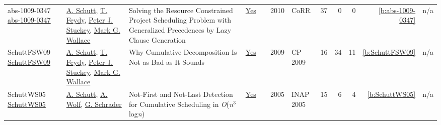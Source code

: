 {\begin{longtable}{>{\raggedright\arraybackslash}p{3cm}>{\raggedright\arraybackslash}p{6cm}>{\raggedright\arraybackslash}p{6.5cm}rrrp{2.5cm}rrrrr}
abs-1009-0347 \href{http://arxiv.org/abs/1009.0347}{abs-1009-0347} & \hyperref[auth:a125]{A. Schutt}, \hyperref[auth:a155]{T. Feydy}, \hyperref[auth:a126]{Peter J. Stuckey}, \hyperref[auth:a117]{Mark G. Wallace} & Solving the Resource Constrained Project Scheduling Problem with Generalized Precedences by Lazy Clause Generation & \href{../works/abs-1009-0347.pdf}{Yes} & \cite{abs-1009-0347} & 2010 & CoRR & 37 & 0 & 0 & \ref{b:abs-1009-0347} & n/a\\
SchuttFSW09 \href{https://doi.org/10.1007/978-3-642-04244-7_58}{SchuttFSW09} & \hyperref[auth:a125]{A. Schutt}, \hyperref[auth:a155]{T. Feydy}, \hyperref[auth:a126]{Peter J. Stuckey}, \hyperref[auth:a117]{Mark G. Wallace} & Why Cumulative Decomposition Is Not as Bad as It Sounds & \href{../works/SchuttFSW09.pdf}{Yes} & \cite{SchuttFSW09} & 2009 & CP 2009 & 16 & 34 & 11 & \ref{b:SchuttFSW09} & n/a\\
SchuttWS05 \href{https://doi.org/10.1007/11963578_6}{SchuttWS05} & \hyperref[auth:a125]{A. Schutt}, \hyperref[auth:a51]{A. Wolf}, \hyperref[auth:a716]{G. Schrader} & Not-First and Not-Last Detection for Cumulative Scheduling in \emph{O}(\emph{n}\({}^{\mbox{3}}\)log\emph{n}) & \href{../works/SchuttWS05.pdf}{Yes} & \cite{SchuttWS05} & 2005 & INAP 2005 & 15 & 6 & 4 & \ref{b:SchuttWS05} & n/a\\
\end{longtable}
}

\clearpage
